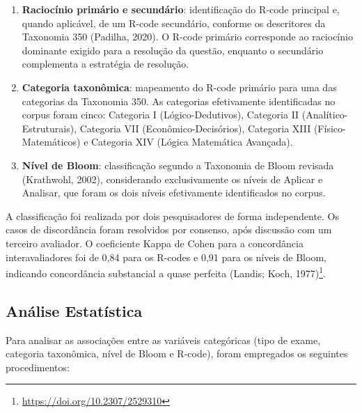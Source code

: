 \documentclass[
  12pt,
  a4paper,
  twoside,
  brazilian
]{article}
\begin{document}
\begin{enumerate}
\def\labelenumi{\arabic{enumi}.}
\item
  \textbf{Raciocínio primário e secundário}: identificação do R-code
  principal e, quando aplicável, de um R-code secundário, conforme os
  descritores da Taxonomia 350 (Padilha, 2020). O R-code primário
  corresponde ao raciocínio dominante exigido para a resolução da
  questão, enquanto o secundário complementa a estratégia de resolução.
\item
  \textbf{Categoria taxonômica}: mapeamento do R-code primário para uma
  das categorias da Taxonomia 350. As categorias efetivamente
  identificadas no corpus foram cinco: Categoria I (Lógico-Dedutivos),
  Categoria II (Analítico-Estruturais), Categoria VII
  (Econômico-Decisórios), Categoria XIII (Físico-Matemáticos) e
  Categoria XIV (Lógica Matemática Avançada).
\item
  \textbf{Nível de Bloom}: classificação segundo a Taxonomia de Bloom
  revisada (Krathwohl, 2002), considerando exclusivamente os níveis de
  Aplicar e Analisar, que foram os dois níveis efetivamente
  identificados no corpus.
\end{enumerate}

A classificação foi realizada por dois pesquisadores de forma
independente. Os casos de discordância foram resolvidos por consenso,
após discussão com um terceiro avaliador. O coeficiente Kappa de Cohen
para a concordância interavaliadores foi de 0,84 para os R-codes e 0,91
para os níveis de Bloom, indicando concordância substancial a quase
perfeita (Landis; Koch, 1977)\footnote{\url{https://doi.org/10.2307/2529310}}.

\subsection{Análise Estatística}\label{anuxe1lise-estatuxedstica}

Para analisar as associações entre as variáveis categóricas (tipo de
exame, categoria taxonômica, nível de Bloom e R-code), foram empregados
os seguintes procedimentos:
\end{document}
